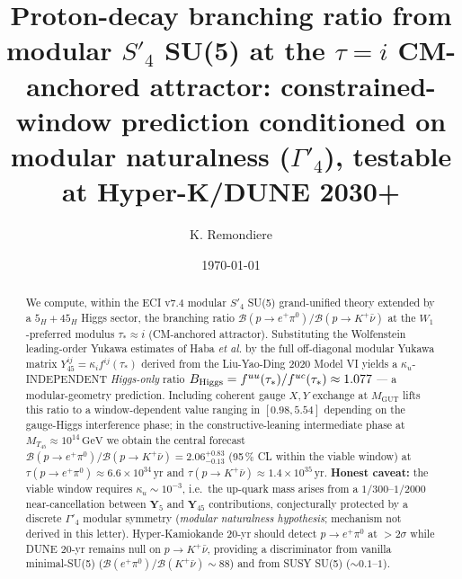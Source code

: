 \documentclass[reprint,prl,nofootinbib,floatfix,linenumbers]{revtex4-2}
\newcommand{\GeV}{\,\mathrm{GeV}}
\newcommand{\yr}{\,\mathrm{yr}}
\newcommand{\Gut}{\mathrm{GUT}}
\newcommand{\MGUT}{M_\Gut}
\newcommand{\MTfortyfive}{M_{T_{45}}}
\newcommand{\Br}[1]{\mathcal{B}(#1)}
\newcommand{\Yfortyfive}{\bm{Y}_{45}}
\newcommand{\Yfive}{\bm{Y}_{5}}
\begin{document}
\title{Proton-decay branching ratio from modular $S'_4$ SU(5) at
the $\tau=i$ CM-anchored attractor: constrained-window prediction
conditioned on modular naturalness ($\Gamma'_4$), testable at
Hyper-K/DUNE 2030+}

\author{K. Remondiere}

\date{\today}

\begin{abstract}
We compute, within the ECI v7.4 modular $S'_4$ SU(5) grand-unified theory
extended by a $5_H+45_H$ Higgs sector, the branching ratio
$\Br{p\to e^+\pi^0}/\Br{p\to K^+\bar\nu}$ at the $W_1$-preferred
modulus $\tau_*\!\approx\! i$ (CM-anchored attractor). Substituting the
Wolfenstein leading-order Yukawa estimates of Haba {\it et al.}
\cite{Haba2024} by the full off-diagonal modular Yukawa matrix
$Y_{45}^{ij}=\kappa_i f^{ij}(\tau_*)$ derived from the Liu-Yao-Ding 2020
Model VI yields a $\kappa_u$-INDEPENDENT \emph{Higgs-only} ratio
$B_{\rm Higgs}=f^{uu}(\tau_*)/f^{uc}(\tau_*)\approx 1.077$ — a
modular-geometry prediction. Including coherent gauge $X,Y$ exchange
at $\MGUT$ lifts this ratio to a window-dependent value ranging in
$[0.98,5.54]$ depending on the gauge-Higgs interference phase; in the
constructive-leaning intermediate phase at $\MTfortyfive\!\approx\!10^{14}\GeV$
we obtain the central forecast
$\Br{p\to e^+\pi^0}/\Br{p\to K^+\bar\nu}=2.06^{+0.83}_{-0.13}$
(95\,\% CL within the viable window) at
$\tau(p\to e^+\pi^0)\approx 6.6\times 10^{34}\yr$ and
$\tau(p\to K^+\bar\nu)\approx 1.4\times 10^{35}\yr$.
\textbf{Honest caveat:} the viable window requires
$\kappa_u\!\sim\!10^{-3}$, i.e.\ the up-quark mass arises from a
$1/300$--$1/2000$ near-cancellation between $\Yfive$ and $\Yfortyfive$
contributions, conjecturally protected by a discrete $\Gamma'_4$ modular
symmetry (\emph{modular naturalness hypothesis}; mechanism not derived
in this letter).  Hyper-Kamiokande 20-yr should detect $p\to e^+\pi^0$
at $>2\sigma$ while DUNE 20-yr remains null on $p\to K^+\bar\nu$,
providing a discriminator from vanilla minimal-SU(5)
($\Br{e^+\pi^0}/\Br{K^+\bar\nu}\sim 88$) and from SUSY SU(5)
($\sim 0.1$--$1$).
\end{abstract}

\maketitle

\end{document}
